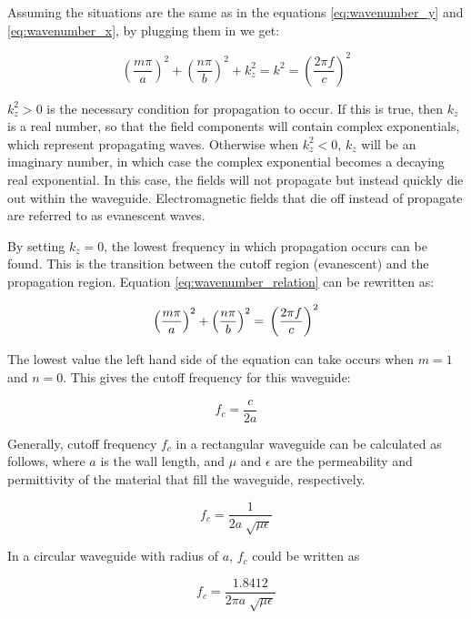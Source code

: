\documentclass[a4paper,12pt]{report}
\begin{document}
Assuming the situations are the same as
in the equations \ref{eq:wavenumber_y} and \ref{eq:wavenumber_x},
by plugging them in we get:

\begin{equation} \label{eq:wavenumber_relation}
  \left(\frac{m\pi}{a}\right)^2 + \left(\frac{n\pi}{b}\right)^2 + k_z^2 = k^2 = \left(\frac{2\pi f}{c}\right)^2
\end{equation}

$k_z^2 > 0$ is the necessary condition for propagation to occur.
If this is true, then $k_z$ is a real number,
so that the field components will contain complex exponentials,
which represent propagating waves.
Otherwise when $k_z^2 < 0$,
$k_z$ will be an imaginary number,
in which case the complex exponential becomes a decaying real exponential.
In this case, the fields will not propagate but instead quickly die out within the waveguide.
Electromagnetic fields that die off instead of propagate are referred to as evanescent waves.

By setting $k_z=0$,
the lowest frequency in which propagation occurs can be found.
This is the transition between
the cutoff region (evanescent) and the propagation region.
Equation \ref{eq:wavenumber_relation} can be rewritten as:

\begin{equation}
  \left(\frac{m\pi}{a}\right)^2 + \left(\frac{n\pi}{b}\right)^2 =\\
   \left(\frac{2\pi f}{c}\right)^2
\end{equation}

The lowest value the left hand side of the equation can take
occurs when $m=1$ and $n=0$.
This gives the cutoff frequency for this waveguide:

\begin{equation}
  f_c = \frac{c}{2a}
\end{equation}

Generally, cutoff frequency $f_c$ in a rectangular waveguide can be
calculated as follows,
where $a$ is the wall length, and $\mu$ and $\epsilon$ are
the permeability and permittivity of the material
that fill the waveguide, respectively.

\begin{equation}
  f_c = \frac{1}{2a\sqrt[]{\mu\epsilon}}
\end{equation}

In a circular waveguide with radius of $a$,
$f_c$ could be written as

\begin{equation}
  f_c = \frac{1.8412}{2\pi a\sqrt[]{\mu\epsilon}}
\end{equation}
\end{document}
